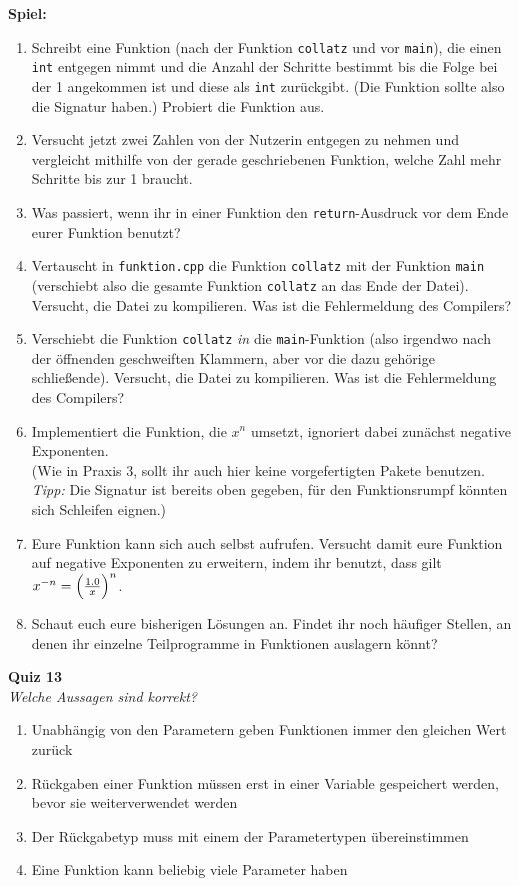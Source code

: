 \textbf{Spiel:}
\begin{enumerate}
	\item Schreibt eine Funktion (nach der Funktion \texttt{collatz} und vor \texttt{main}), die einen \texttt{int} entgegen nimmt und die Anzahl der Schritte bestimmt bis die Folge bei der 1 angekommen ist und diese als \texttt{int} zurückgibt.
	(Die Funktion sollte also die Signatur  haben.)
	Probiert die Funktion aus.
	\item Versucht jetzt zwei Zahlen von der Nutzerin entgegen zu nehmen und vergleicht mithilfe von der gerade geschriebenen Funktion, welche Zahl mehr Schritte bis zur 1 braucht.
    \item Was passiert, wenn ihr in einer Funktion den \texttt{return}-Ausdruck vor dem Ende eurer Funktion benutzt?
    \item Vertauscht in \texttt{funktion.cpp} die Funktion \texttt{collatz} mit der Funktion \texttt{main} (verschiebt also die gesamte Funktion \texttt{collatz} an das Ende der Datei).
        Versucht, die Datei zu kompilieren.
        Was ist die Fehlermeldung des Compilers?
    \item Verschiebt die Funktion \texttt{collatz} \emph{in} die \texttt{main}-Funktion (also irgendwo nach der öffnenden geschweiften Klammern, aber vor die dazu gehörige schließende).
        Versucht, die Datei zu kompilieren. Was ist die Fehlermeldung des Compilers?
    \item Implementiert die Funktion, die $x^n$ umsetzt, ignoriert dabei zunächst negative Exponenten. \\
        (Wie in Praxis 3, sollt ihr auch hier keine vorgefertigten Pakete benutzen. \emph{Tipp:} Die Signatur ist bereits oben gegeben, für den Funktionsrumpf könnten sich Schleifen eignen.)
    \item Eure Funktion kann sich auch selbst aufrufen. Versucht damit eure Funktion auf negative Exponenten zu erweitern, indem ihr benutzt, dass gilt $x^{-n} = \Bigl(\frac{1.0}{x}\Bigr)^n$.
    \item Schaut euch eure bisherigen Lösungen an.
        Findet ihr noch häufiger Stellen, an denen ihr einzelne Teilprogramme in Funktionen auslagern könnt?
\end{enumerate}

\textbf{Quiz 13}\\
\textit{Welche Aussagen sind korrekt?}
\begin{enumerate}[label=\alph]
    \item Unabhängig von den Parametern geben Funktionen immer den gleichen Wert zurück
    \item Rückgaben einer Funktion müssen erst in einer Variable gespeichert werden, bevor sie weiterverwendet werden
    \item Der Rückgabetyp muss mit einem der Parametertypen übereinstimmen
    \item Eine Funktion kann beliebig viele Parameter haben
\end{enumerate}
